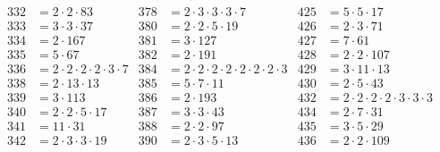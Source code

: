 \begin{align*}
  332&=2\cdot2\cdot83                        & 378&=2\cdot3\cdot3\cdot3\cdot7                   & 425&=5\cdot5\cdot17                        \\
  333&=3\cdot3\cdot37                        & 380&=2\cdot2\cdot5\cdot19                        & 426&=2\cdot3\cdot71                        \\
  334&=2\cdot167                             & 381&=3\cdot127                                   & 427&=7\cdot61                              \\
  335&=5\cdot67                              & 382&=2\cdot191                                   & 428&=2\cdot2\cdot107                       \\
  336&=2\cdot2\cdot2\cdot2\cdot3\cdot7       & 384&=2\cdot2\cdot2\cdot2\cdot2\cdot2\cdot2\cdot3 & 429&=3\cdot11\cdot13                       \\
  338&=2\cdot13\cdot13                       & 385&=5\cdot7\cdot11                              & 430&=2\cdot5\cdot43                        \\
  339&=3\cdot113                             & 386&=2\cdot193                                   & 432&=2\cdot2\cdot2\cdot2\cdot3\cdot3\cdot3 \\
  340&=2\cdot2\cdot5\cdot17                  & 387&=3\cdot3\cdot43                              & 434&=2\cdot7\cdot31                        \\
  341&=11\cdot31                             & 388&=2\cdot2\cdot97                              & 435&=3\cdot5\cdot29                        \\
  342&=2\cdot3\cdot3\cdot19                  & 390&=2\cdot3\cdot5\cdot13                        & 436&=2\cdot2\cdot109                      
\end{align*}

